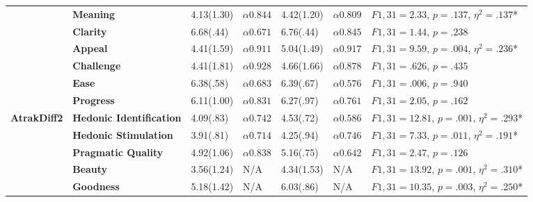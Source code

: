 \documentclass{sigchi}
\begin{document}
\begin{scriptsize}
\begin{table}
\begin{tabular}{p{1.1cm}p{1.1cm}p{1.1cm}llll}
\textbf{}           & \textbf{Meaning}                & 4.13(1.30)           & $\alpha0.844$          & 4.42(1.20)         & $\alpha0.809$         & $F{1,31} = 2.33$, $p = .137$, $\eta^2=.137$*   \\
\textbf{}           & \textbf{Clarity}                & 6.68(.44)            & $\alpha0.671$          & 6.76(.44)          & $\alpha0.845$         & $F{1,31} = 1.44$, $p = .238$             \\
\textbf{}           & \textbf{Appeal}                 & 4.41(1.59)           & $\alpha0.911$          & 5.04(1.49)         & $\alpha0.917$         & $F{1,31} = 9.59$, $p = .004$, $\eta^2=.236$*   \\
\textbf{}           & \textbf{Challenge}              & 4.41(1.81)           & $\alpha0.928$          & 4.66(1.66)         & $\alpha0.878$         & $F{1,31} = .626$, $p = .435$             \\
\textbf{}           & \textbf{Ease}                   & 6.38(.58)            & $\alpha0.683$         & 6.39(.67)          & $\alpha0.576$         & $F{1,31} = .006$, $p = .940$             \\
\textbf{}           & \textbf{Progress}               & 6.11(1.00)           & $\alpha0.831$          & 6.27(.97)          & $\alpha0.761$         & $F{1,31} = 2.05$, $p = .162$             \\
\textbf{AtrakDiff2} & \textbf{Hedonic Identification} & 4.09(.83)            & $\alpha0.742$          & 4.53(.72)          & $\alpha0.586$         & $F{1,31} = 12.81$, $p = .001$, $\eta^2=.293$*  \\ \hline
\textbf{}           & \textbf{Hedonic Stimulation}    & 3.91(.81)            & $\alpha0.714$          & 4.25(.94)          & $\alpha0.746$         & $F{1,31} = 7.33$, $p = .011$, $\eta^2=.191$*   \\
\textbf{}           & \textbf{Pragmatic Quality}      & 4.92(1.06)           & $\alpha0.838$          & 5.16(.75)          & $\alpha0.642$         & $F{1,31} = 2.47$, $p = .126$             \\
\textbf{}           & \textbf{Beauty}                 & 3.56(1.24)           & N/A            & 4.34(1.53)         & N/A           & $F{1,31} = 13.92$, $p = .001$, $\eta^2=.310$*  \\
\textbf{}           & \textbf{Goodness}               & 5.18(1.42)           & N/A            & 6.03(.86)          & N/A           & $F{1,31} = 10.35$, $p = .003$, $\eta^2=.250$*  \\ \hline

\end{tabular}
\end{table}
\end{scriptsize}
\end{document}
